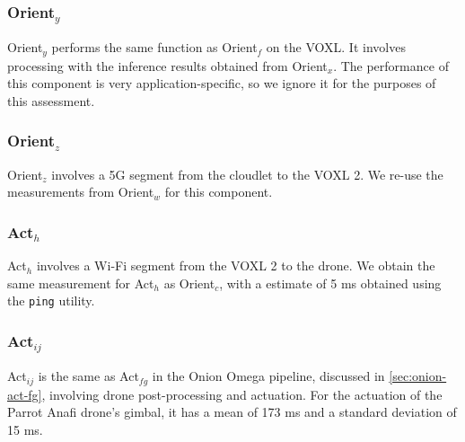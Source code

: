 \subsubsection*{Orient$_{y}$}

Orient$_y$ performs the same function as Orient$_f$ on the VOXL.  It involves
processing with the inference results obtained from Orient$_x$. The performance
of this component is very application-specific, so we ignore it for the
purposes of this assessment.

\subsubsection*{Orient$_{z}$}

Orient$_z$ involves a 5G segment from the cloudlet to the VOXL 2. We re-use
the measurements from Orient$_{w}$ for this component.

\subsubsection*{Act$_{h}$}

Act$_h$ involves a Wi-Fi segment from the VOXL 2 to the drone. We obtain the
same measurement for Act$_h$ as Orient$_c$, with a estimate of 5 ms obtained
using the \texttt{ping} utility.

\subsubsection*{Act$_{ij}$}

Act$_{ij}$ is the same as Act$_{fg}$ in the Onion Omega pipeline, discussed in \cref{sec:onion-act-fg}, involving drone post-processing and actuation. For the actuation of the Parrot Anafi drone's gimbal, it has a mean of 173 ms and a standard deviation of 15 ms.

